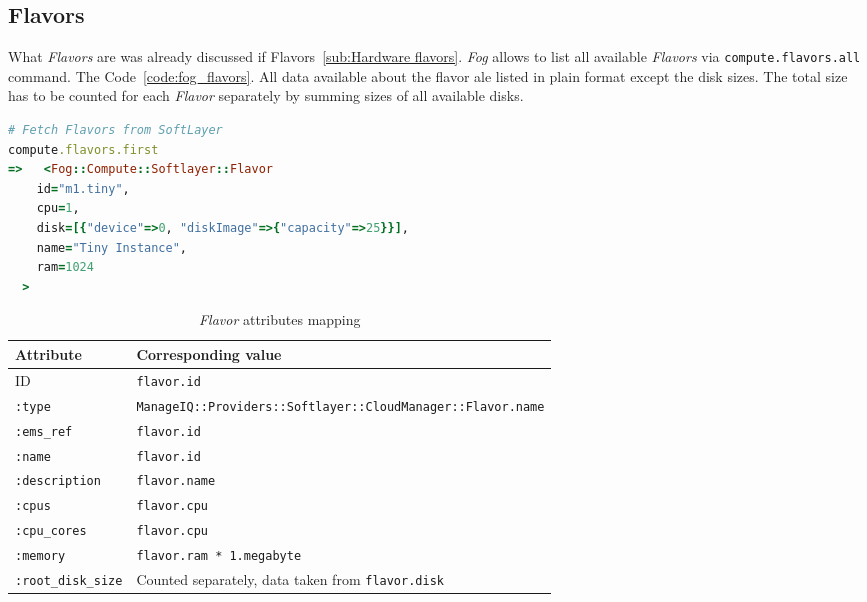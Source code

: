 \subsection{Flavors}
\label{sub:Flavors}

What \emph{Flavors} are was already discussed if Flavors~\ref{sub:Hardware flavors}. \emph{Fog} allows to list all available \emph{Flavors} via \verb|compute.flavors.all| command. The Code~\ref{code:fog_flavors}. All data available about the flavor ale listed in plain format except the disk sizes. The total size has to be counted for each \emph{Flavor} separately by summing sizes of all available disks.

\begin{lstlisting}[language=Ruby,caption={Sample of \emph{Flavors} data},label=code:fog_flavors,float=htpb]
# Fetch Flavors from SoftLayer
compute.flavors.first
=>   <Fog::Compute::Softlayer::Flavor
    id="m1.tiny",
    cpu=1,
    disk=[{"device"=>0, "diskImage"=>{"capacity"=>25}}],
    name="Tiny Instance",
    ram=1024
  >
\end{lstlisting}

\begin{table}[ht]
	\centering
	\caption{\emph{Flavor} attributes mapping}\label{tab:Flavor attributes mapping}
	\begin{tabular}{ll}
		\toprule
		Attribute              & Corresponding value                                                    \\
		\midrule
		ID                     & \verb|flavor.id|                                                       \\
		\verb|:type|           & \small\verb|ManageIQ::Providers::Softlayer::CloudManager::Flavor.name| \\
		\verb|:ems_ref|        & \verb|flavor.id|                                                       \\
		\verb|:name|           & \verb|flavor.id|                                                       \\
		\verb|:description|    & \verb|flavor.name|                                                     \\
		\verb|:cpus|           & \verb|flavor.cpu|                                                      \\
		\verb|:cpu_cores|      & \verb|flavor.cpu|                                                      \\
		\verb|:memory|         & \verb|flavor.ram * 1.megabyte|                                         \\
		\verb|:root_disk_size| & Counted separately, data taken from \verb|flavor.disk|                 \\
		\bottomrule
	\end{tabular}
\end{table}

